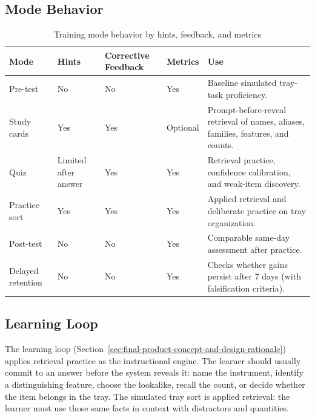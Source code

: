 \documentclass[10pt,a4paper]{article}
\begin{document}
\subsection{Mode Behavior}


\begin{table}[H]
\centering
\caption{Training mode behavior by hints, feedback, and metrics}
\label{tab:training-mode-behavior-by-hints-feedback-and-metrics}
\small\renewcommand{\arraystretch}{1.2}\setlength{\tabcolsep}{4pt}
\begin{tabularx}{\textwidth}{|>{\raggedright\arraybackslash}X|>{\raggedright\arraybackslash}X|>{\raggedright\arraybackslash}X|>{\raggedright\arraybackslash}X|>{\raggedright\arraybackslash}X|}
\hline
Mode & Hints & Corrective Feedback & Metrics & Use \\
\hline
Pre-test & No & No & Yes & Baseline simulated tray-task proficiency. \\
\hline
Study cards & Yes & Yes & Optional & Prompt-before-reveal retrieval of names, aliases, families, features, and counts. \\
\hline
Quiz & Limited after answer & Yes & Yes & Retrieval practice, confidence calibration, and weak-item discovery. \\
\hline
Practice sort & Yes & Yes & Yes & Applied retrieval and deliberate practice on tray organization. \\
\hline
Post-test & No & No & Yes & Comparable same-day assessment after practice. \\
\hline
Delayed retention & No & No & Yes & Checks whether gains persist after 7 days (with falsification criteria). \\
\hline
\end{tabularx}
\end{table}
\subsection{Learning Loop}


The learning loop (Section~\ref{sec:final-product-concept-and-design-rationale}) applies retrieval practice as the instructional engine. The learner should usually
commit to an answer before the system reveals it: name the instrument, identify
a distinguishing feature, choose the lookalike, recall the count, or decide
whether the item belongs in the tray. The simulated tray sort is applied
retrieval: the learner must use those same facts in context with distractors
and quantities.
\end{document}
